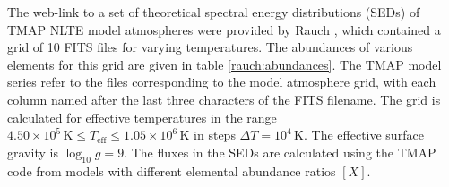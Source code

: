 				The web-link to a set of theoretical spectral energy distributions (SEDs) of TMAP NLTE model atmospheres were provided by Rauch \cite{rauchFITS}, which contained a grid of 10 FITS files for varying temperatures. The abundances of various elements for this grid are given in table \ref{rauch:abundances}. The TMAP model series refer to the files corresponding to the model atmosphere grid, with each column named after the last three characters of the FITS filename. The grid is calculated for effective temperatures in the range $4.50\times 10^5\,\text{K}\leqslant T_\text{eff}\leqslant 1.05\times 10^6\,\text{K}$ in steps $\Delta T=10^4\,\text{K}$. The effective surface gravity is $\log_{10}{g}=9$. The fluxes in the SEDs are calculated using the TMAP code from models with different elemental abundance ratios $[X]$.
				
